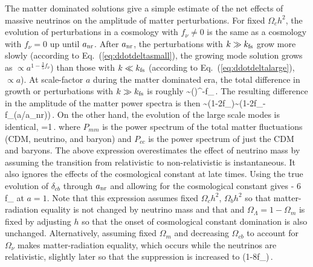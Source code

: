 The matter dominated solutions give a simple estimate of the net effects of massive neutrinos on the amplitude of matter perturbations. For fixed $\Omega_c h^2$, the evolution of perturbations in a cosmology with $f_\nu \neq 0$ is the same as a cosmology with $f_\nu =0$ up until $a_{\rm nr}$. After $a_{\rm nr}$, the perturbations with $k\gg k_{\rm fs}$ grow more slowly (according to Eq.~(\ref{eq:ddotdeltasmall}), the growing mode solution grows as  $\propto a^{1-\frac{3}{5}f_\nu}$) than those with $k\ll k_{\rm fs}$ (according to Eq.~(\ref{eq:ddotdeltalarge}), $\propto a$).  At scale-factor $a$ during the matter dominated era, the total difference in growth or perturbations with $k\gg k_{\rm fs}$ is roughly
\beq
{} \sim \left(\right)^{-f_\nu}\,.
\eeq
The resulting difference in the amplitude of the matter power spectra is then 
\beq
{}\sim (1-2f_\nu)\sim \left(1-2f_\nu -f_\nu\ln\left(a/a_{\rm nr}\right)\right)\,.
\eeq
On the other hand, the evolution of the large scale modes is identical,
\beq
{}=1\,.
\eeq
where $P_{mm}$ is the power spectrum of the total matter fluctuations (CDM, neutrino, and baryon) and $P_{cc}$ is the power spectrum of just the CDM and baryons.  The above expression overestimates the effect of neutrino mass by assuming the transition from relativistic to non-relativistic is instantaneous. It also ignores the effects of the cosmological constant at late times. Using the true evolution of $\delta_{cb}$ through $a_{\rm nr}$ and allowing for the cosmological constant gives 
\beq
{} - 6 f_\nu
\eeq
at $a=1$. Note that this expression assumes fixed $\Omega_ch^2$, $\Omega_bh^2$ so that matter-radiation equality is not changed by neutrino mass and that and $\Omega_\Lambda = 1-\Omega_m$ is fixed by adjusting $h$ so that the onset of cosmological constant domination is also unchanged. Alternatively, assuming fixed $\Omega_m$ and decreasing $\Omega_{cb}$ to account for $\Omega_\nu$ makes matter-radiation equality, which occurs while the neutrinos are relativistic, slightly later so that the suppression is increased to
\beq
{} \approx (1-8f_\nu)\,.
\eeq

